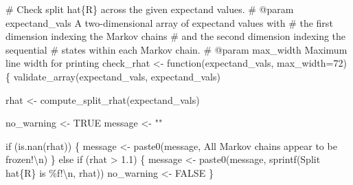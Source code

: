 \documentclass[
  letterpaper,
  DIV=11,
  numbers=noendperiod]{scrartcl}
\newenvironment{Shaded}{\begin{snugshade}}{\end{snugshade}}
\newcommand{\CharTok}[1]{\textcolor[rgb]{0.13,0.47,0.30}{#1}}
\newcommand{\CommentTok}[1]{\textcolor[rgb]{0.37,0.37,0.37}{#1}}
\newcommand{\ControlFlowTok}[1]{\textcolor[rgb]{0.00,0.23,0.31}{#1}}
\newcommand{\DecValTok}[1]{\textcolor[rgb]{0.68,0.00,0.00}{#1}}
\newcommand{\FloatTok}[1]{\textcolor[rgb]{0.68,0.00,0.00}{#1}}
\newcommand{\KeywordTok}[1]{\textcolor[rgb]{0.00,0.23,0.31}{#1}}
\newcommand{\NormalTok}[1]{\textcolor[rgb]{0.00,0.23,0.31}{#1}}
\newcommand{\OperatorTok}[1]{\textcolor[rgb]{0.37,0.37,0.37}{#1}}
\newcommand{\SpecialCharTok}[1]{\textcolor[rgb]{0.37,0.37,0.37}{#1}}
\newcommand{\StringTok}[1]{\textcolor[rgb]{0.13,0.47,0.30}{#1}}
\begin{document}
\begin{Shaded}
\begin{Highlighting}[]
\CommentTok{\# Check split hat\{R\} across the given expectand values.}
\CommentTok{\# @param expectand\_vals A two{-}dimensional array of expectand values with}
\CommentTok{\#                       the first dimension indexing the Markov chains}
\CommentTok{\#                       and the second dimension indexing the sequential}
\CommentTok{\#                       states within each Markov chain.}
\CommentTok{\# @param max\_width Maximum line width for printing}
\NormalTok{check\_rhat }\OperatorTok{\textless{}{-}}\NormalTok{ function(expectand\_vals, max\_width}\OperatorTok{=}\DecValTok{72}\NormalTok{) \{}
\NormalTok{  validate\_array(expectand\_vals, }\StringTok{\textquotesingle{}expectand\_vals\textquotesingle{}}\NormalTok{)}

\NormalTok{  rhat }\OperatorTok{\textless{}{-}}\NormalTok{ compute\_split\_rhat(expectand\_vals)}

\NormalTok{  no\_warning }\OperatorTok{\textless{}{-}}\NormalTok{ TRUE}
\NormalTok{  message }\OperatorTok{\textless{}{-}} \StringTok{""}

  \ControlFlowTok{if}\NormalTok{ (}\KeywordTok{is}\NormalTok{.nan(rhat)) \{}
\NormalTok{    message }\OperatorTok{\textless{}{-}}\NormalTok{ paste0(message, }
                      \StringTok{\textquotesingle{}All Markov chains appear to be frozen!}\CharTok{\textbackslash{}n}\StringTok{\textquotesingle{}}\NormalTok{)}
\NormalTok{  \} }\ControlFlowTok{else} \ControlFlowTok{if}\NormalTok{ (rhat }\OperatorTok{\textgreater{}} \FloatTok{1.1}\NormalTok{) \{}
\NormalTok{    message }\OperatorTok{\textless{}{-}}\NormalTok{ paste0(message, sprintf(}\StringTok{\textquotesingle{}Split hat}\SpecialCharTok{\{R\}}\StringTok{ is }\SpecialCharTok{\%f}\StringTok{!}\CharTok{\textbackslash{}n}\StringTok{\textquotesingle{}}\NormalTok{, rhat))}
\NormalTok{    no\_warning }\OperatorTok{\textless{}{-}}\NormalTok{ FALSE}
\NormalTok{  \}}
  

\end{Highlighting}
\end{Shaded}
\end{document}
